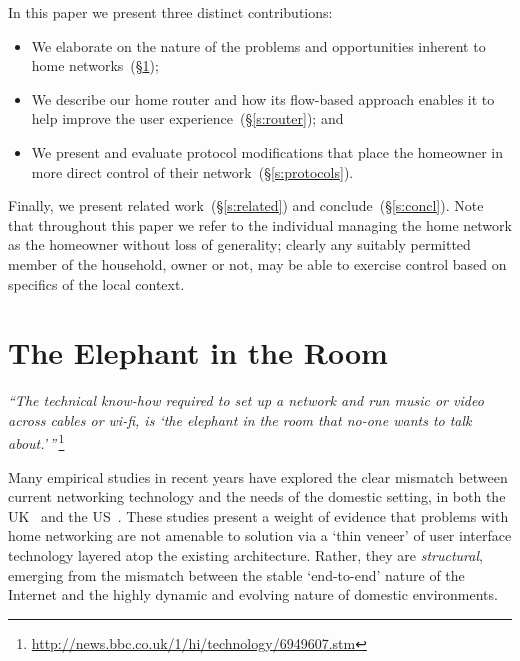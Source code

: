 In this paper we present three distinct contributions: 
\begin{itemize}
\item We elaborate on the nature of the problems and opportunities
      inherent to home networks~(\S\ref{s:elephant});
\item We describe our home router and how its flow-based approach
      enables it to help improve the user
      experience~(\S\ref{s:router}); and
\item We present and evaluate protocol modifications that place the
      homeowner in more direct control of their
      network~(\S\ref{s:protocols}).
\end{itemize}


Finally, we present related work~(\S\ref{s:related}) and
conclude~(\S\ref{s:concl}).  Note that throughout this paper we refer
to the individual managing the home network as the homeowner without
loss of generality; clearly any suitably permitted member of the
household, owner or not, may be able to exercise control based on
specifics of the local context. 

\section{The Elephant in the Room}
\label{s:elephant}

{\it ``The technical know-how required to set up a network and run
music or video across cables or wi-fi, is `the elephant in the room
that no-one wants to talk about.'\,''}\,\footnote{\url{http://news.bbc.co.uk/1/hi/technology/6949607.stm}}

Many empirical studies in recent years have explored the clear
mismatch between current networking technology and the needs of the
domestic setting,  in both  the
UK~\cite{tolmie07:_makin,rodden07:_disap_comput,rodden04:_domes,rodden04:_between,crabtree03:_findin_place_ubicom_home}
and the
US~\cite{shehan07:_home_networ_hci,grinter05:_work_make_home_networ_work,sung07:_my_roomb_rambo,chetty07:_how_smart_homes_learn,shehanpoole08:_desig_inter_home_networ_maint_tools}.
These studies present a weight of evidence that problems with home
networking are not amenable to solution via a `thin veneer' of user
interface technology layered atop the existing architecture.  Rather,
they are
\emph{structural}, emerging from the mismatch between the stable
`end-to-end' nature of the Internet and the highly dynamic and
evolving nature of domestic environments.  

